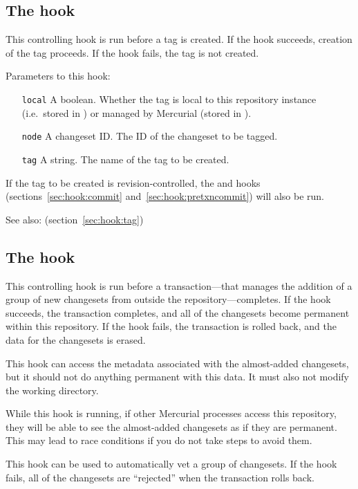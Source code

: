 \subsection{The  hook}
\label{sec:hook:pretag}

This controlling hook is run before a tag is created.  If the hook
succeeds, creation of the tag proceeds.  If the hook fails, the tag is
not created.

Parameters to this hook:
\begin{itemize}
\item[\texttt{local}] A boolean.  Whether the tag is local to this
  repository instance (i.e.~stored in ) or managed
  by Mercurial (stored in ).
\item[\texttt{node}] A changeset ID.  The ID of the changeset to be tagged.
\item[\texttt{tag}] A string.  The name of the tag to be created.
\end{itemize}

If the tag to be created is revision-controlled, the 
and  hooks (sections~\ref{sec:hook:commit}
and~\ref{sec:hook:pretxncommit}) will also be run.

See also:  (section~\ref{sec:hook:tag})

\subsection{The  hook}
\label{sec:hook:pretxnchangegroup}

This controlling hook is run before a transaction---that manages the
addition of a group of new changesets from outside the
repository---completes.  If the hook succeeds, the transaction
completes, and all of the changesets become permanent within this
repository.  If the hook fails, the transaction is rolled back, and
the data for the changesets is erased.

This hook can access the metadata associated with the almost-added
changesets, but it should not do anything permanent with this data.
It must also not modify the working directory.

While this hook is running, if other Mercurial processes access this
repository, they will be able to see the almost-added changesets as if
they are permanent.  This may lead to race conditions if you do not
take steps to avoid them.

This hook can be used to automatically vet a group of changesets.  If
the hook fails, all of the changesets are ``rejected'' when the
transaction rolls back.

